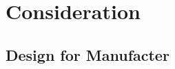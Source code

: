 
\chapter{Consideration} %



\ifpdf
    \graphicspath{{7/figures/PNG/}{7/figures/PDF/}{7/figures/}}
\else
    \graphicspath{{7/figures/EPS/}{7/figures/}}
\fi








\section{Design for Manufacter}



